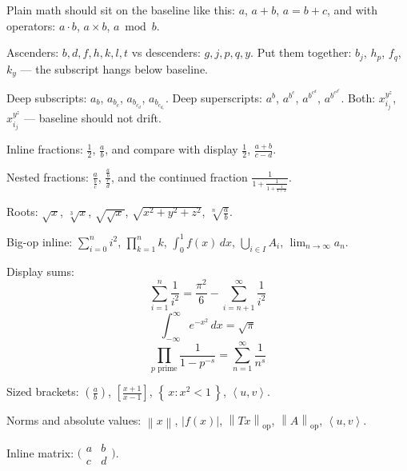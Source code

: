 \documentclass{article}
\newcommand{\norm}[1]{\left\lVert#1\right\rVert}
\newcommand{\abs}[1]{\left\lvert#1\right\rvert}
\newcommand{\inner}[2]{\left\langle#1,#2\right\rangle}
\newcommand{\opnorm}[1]{\norm{#1}_{\text{op}}}
\begin{document}

Plain math should sit on the baseline like this: $a$, $a+b$, $a=b+c$,
and with operators: $a \cdot b$, $a \times b$, $a \bmod b$.

Ascenders: $b, d, f, h, k, l, t$ vs descenders: $g, j, p, q, y$.  Put them
together: $b_j$, $h_p$, $f_q$, $k_y$ — the subscript hangs below baseline.

Deep subscripts: $a_b$, $a_{b_c}$, $a_{b_{c_d}}$, $a_{b_{c_{d_e}}}$.
Deep superscripts: $a^b$, $a^{b^c}$, $a^{b^{c^d}}$, $a^{b^{c^{d^e}}}$.
Both: $x^{y^z}_{i_j}$, $x_{i_j}^{y^z}$ — baseline should not drift.


Inline fractions: $\tfrac{1}{2}$, $\tfrac{a}{b}$, and compare with display
$\frac{1}{2}$, $\frac{a+b}{c-d}$.

Nested fractions: $\frac{a}{\frac{b}{c}}$, $\frac{\frac{a}{b}}{\frac{c}{d}}$,
and the continued fraction $\frac{1}{1 + \frac{1}{1 + \frac{1}{1+x}}}$.

Roots: $\sqrt{x}$, $\sqrt[3]{x}$, $\sqrt{\sqrt{x}}$,
$\sqrt{x^2 + y^2 + z^2}$, $\sqrt[n]{\frac{a}{b}}$.


Big-op inline: $\sum_{i=0}^n i^2$, $\prod_{k=1}^n k$, $\int_0^1 f(x)\,dx$,
$\bigcup_{i \in I} A_i$, $\lim_{n \to \infty} a_n$.

Display sums:
\[
\sum_{i=1}^{n} \frac{1}{i^2} = \frac{\pi^2}{6} - \sum_{i=n+1}^{\infty} \frac{1}{i^2}
\]
\[
\int_{-\infty}^{\infty} e^{-x^2}\,dx = \sqrt{\pi}
\]
\[
\prod_{p \text{ prime}} \frac{1}{1 - p^{-s}} = \sum_{n=1}^{\infty} \frac{1}{n^s}
\]


Sized brackets: $\left(\frac{a}{b}\right)$, $\left[\frac{x+1}{x-1}\right]$,
$\left\{\, x : x^2 < 1 \,\right\}$, $\left\langle u, v\right\rangle$.

Norms and absolute values: $\norm{x}$, $\abs{f(x)}$, $\norm{Tx}_{\text{op}}$,
$\opnorm{A}$, $\inner{u}{v}$.


Inline matrix: $\bigl(\begin{smallmatrix} a & b \\ c & d \end{smallmatrix}\bigr)$.
\end{document}

